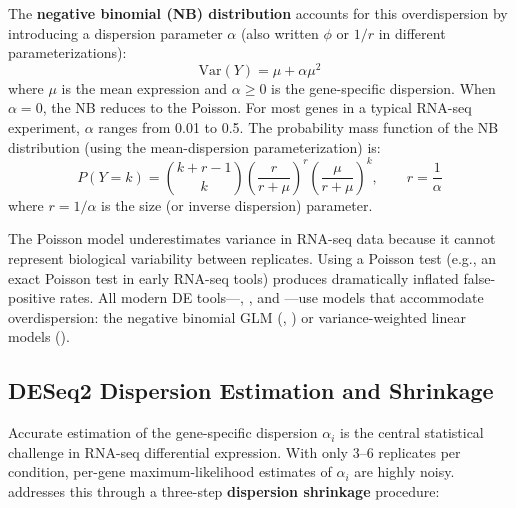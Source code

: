 The \textbf{negative binomial (NB) distribution} accounts for this
overdispersion by introducing a dispersion parameter $\alpha$ (also written
$\phi$ or $1/r$ in different parameterizations):
\begin{equation}
  \label{eq:rnaseq:nbvar}
  \text{Var}(Y) = \mu + \alpha\mu^2
\end{equation}
where $\mu$ is the mean expression and $\alpha \geq 0$ is the gene-specific
dispersion. When $\alpha = 0$, the NB reduces to the Poisson. For most genes in
a typical RNA-seq experiment, $\alpha$ ranges from 0.01 to 0.5. The probability
mass function of the NB distribution (using the mean-dispersion
parameterization) is:
\begin{equation}
  \label{eq:rnaseq:nbpmf}
  P(Y = k) = \binom{k + r - 1}{k}
    \left(\frac{r}{r + \mu}\right)^{r}
    \left(\frac{\mu}{r + \mu}\right)^{k},
    \qquad r = \frac{1}{\alpha}
\end{equation}
where $r = 1/\alpha$ is the size (or inverse dispersion) parameter.

\begin{keyconcept}[title={Why Not Poisson?}]
The Poisson model underestimates variance in RNA-seq data because it cannot
represent biological variability between replicates. Using a Poisson test
(e.g., an exact Poisson test in early RNA-seq tools) produces dramatically
inflated false-positive rates. All modern DE tools---,
, and ---use models that accommodate
overdispersion: the negative binomial GLM (, )
or variance-weighted linear models ().
\end{keyconcept}

\subsection{DESeq2 Dispersion Estimation and Shrinkage}
\label{subsec:rnaseq:deseq2dispersion}

Accurate estimation of the gene-specific dispersion $\alpha_i$ is the central
statistical challenge in RNA-seq differential expression. With only 3--6
replicates per condition, per-gene maximum-likelihood estimates of $\alpha_i$
are highly noisy.  addresses this through a three-step
\textbf{dispersion shrinkage} procedure:

